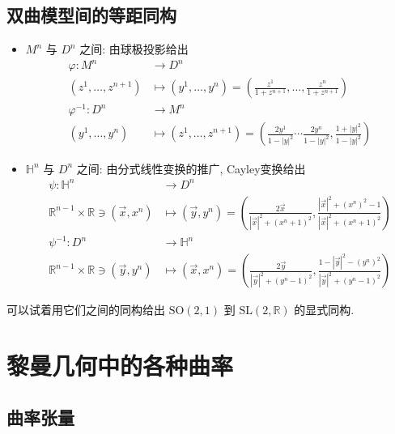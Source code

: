\documentclass{book}
\begin{document}
    \subsection{双曲模型间的等距同构}
        \begin{itemize}
            \item $M^n$ 与 $D^n$ 之间: 由球极投影给出
            \begin{align*}
                \varphi:M^n&\rightarrow D^n \\
                \left(z^1,\dots,z^{n+1}\right)&\mapsto\left(y^1,\dots,y^n\right)=\left(\frac{z^1}{1+z^{n+1}},\dots,\frac{z^n}{1+z^{n+1}}\right) \\
                \varphi^{-1}:D^n&\rightarrow M^n \\
                \left(y^1,\dots,y^n\right)&\mapsto\left(z^1,\dots,z^{n+1}\right)=\left(\frac{2y^1}{1-|y|^2}\cdots\frac{2y^n}{1-|y|^2},\frac{1+|y|^2}{1-|y|^2}\right)
            \end{align*}
            \item $\mathbb{H}^n$ 与 $D^n$ 之间: 由分式线性变换的推广, Cayley变换给出
            \begin{align*}
                \psi:\mathbb{H}^n&\rightarrow D^n \\
                \mathbb{R}^{n-1}\times\mathbb{R}\ni\left(\vec{x},x^n\right)&\mapsto\left(\vec{y},y^n\right)=\left(\frac{2\vec{x}}{|\vec{x}|^2+(x^n+1)^2},\frac{|\vec{x}|^2+(x^n)^2-1}{|\vec{x}|^2+(x^n+1)^2}\right) \\
                \psi^{-1}:D^n&\rightarrow\mathbb{H}^n \\
                \mathbb{R}^{n-1}\times\mathbb{R}\ni\left(\vec{y},y^n\right)&\mapsto\left(\vec{x},x^n\right)=\left(\frac{2\vec{y}}{|\vec{y}|^2+(y^n-1)^2},\frac{1-|\vec{y}|^2-(y^n)^2}{|\vec{y}|^2+(y^n-1)^2}\right)
            \end{align*}
        \end{itemize}
        可以试着用它们之间的同构给出 $\mathrm{SO}(2,1)$ 到 $\mathrm{SL}(2,\mathbb{R})$ 的显式同构.
    
    \section{黎曼几何中的各种曲率}
    \subsection{曲率张量}
\end{document}
